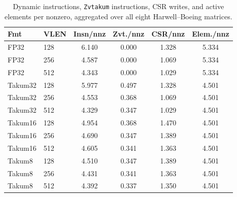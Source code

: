 \begin{table}[t]
\caption{Dynamic instructions, \texttt{Zvtakum} instructions, CSR writes, and active elements per nonzero, aggregated over all eight Harwell--Boeing matrices.}
\label{tab:contagens}
\centering
\scriptsize
\setlength{\tabcolsep}{3.0pt}
\renewcommand{\arraystretch}{0.95}
\begin{tabular}{@{}llcccc@{}}
\toprule
Fmt & VLEN & Insn/nnz & Zvt./nnz & CSR/nnz & Elem./nnz \\
\midrule
FP32 & 128 & 6.140 & 0.000 & 1.328 & 5.334 \\
FP32 & 256 & 4.587 & 0.000 & 1.069 & 5.334 \\
FP32 & 512 & 4.343 & 0.000 & 1.029 & 5.334 \\
\midrule
Takum32 & 128 & 5.977 & 0.497 & 1.328 & 4.501 \\
Takum32 & 256 & 4.553 & 0.368 & 1.069 & 4.501 \\
Takum32 & 512 & 4.329 & 0.347 & 1.029 & 4.501 \\
\midrule
Takum16 & 128 & 4.954 & 0.368 & 1.470 & 4.501 \\
Takum16 & 256 & 4.690 & 0.347 & 1.389 & 4.501 \\
Takum16 & 512 & 4.605 & 0.341 & 1.363 & 4.501 \\
\midrule
Takum8 & 128 & 4.510 & 0.347 & 1.389 & 4.501 \\
Takum8 & 256 & 4.431 & 0.341 & 1.363 & 4.501 \\
Takum8 & 512 & 4.392 & 0.337 & 1.350 & 4.501 \\
\bottomrule
\end{tabular}
\end{table}
